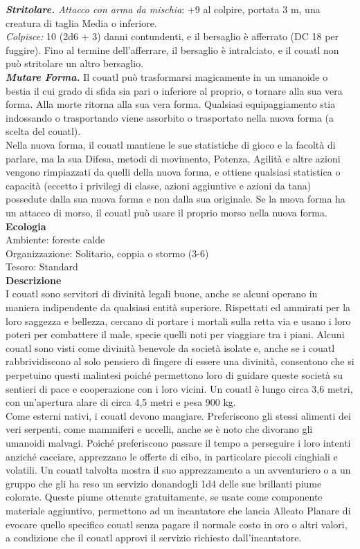 \begin{multicols}{2}
\emph{\textbf{Stritolare.} Attacco con arma da mischia}: +9 al colpire, portata 3 m, una creatura di taglia Media o inferiore.\\
\emph{Colpisce:} 10 (2d6 + 3) danni contundenti, e il bersaglio è afferrato (DC  18 per fuggire). Fino al termine dell'afferrare, il bersaglio è intralciato, e il couatl non può stritolare un altro bersaglio.\\
\emph{\textbf{Mutare Forma.}} Il couatl può trasformarsi magicamente in un umanoide o bestia il cui grado di sfida sia pari o inferiore al proprio, o tornare alla sua vera forma. Alla morte ritorna alla sua vera forma. Qualsiasi equipaggiamento stia indossando o trasportando viene assorbito o trasportato nella nuova forma (a scelta del couatl).\\
Nella nuova forma, il couatl mantiene le sue statistiche di gioco e la facoltà di parlare, ma la sua Difesa, metodi di movimento, Potenza, Agilità e altre azioni vengono rimpiazzati da quelli della nuova forma, e ottiene qualsiasi statistica o capacità (eccetto i privilegi di classe, azioni aggiuntive e azioni da tana) possedute dalla sua nuova forma e non dalla sua originale. Se la nuova forma ha un attacco di morso, il couatl può usare il proprio morso nella nuova forma.\\
\textbf{Ecologia}\\
Ambiente: foreste calde\\
Organizzazione: Solitario, coppia o stormo (3-6)\\
Tesoro: Standard\\
\textbf{Descrizione}\\
I couatl sono servitori di divinità legali buone, anche se alcuni operano in maniera indipendente da qualsiasi entità superiore. Rispettati ed ammirati per la loro saggezza e bellezza, cercano di portare i mortali sulla retta via e usano i loro poteri per combattere il male, specie quelli noti per viaggiare tra i piani. Alcuni couatl sono visti come divinità benevole da società isolate e, anche se i couatl rabbrividiscono al solo pensiero di fingere di essere una divinità, consentono che si perpetuino questi malintesi poiché permettono loro di guidare queste società su sentieri di pace e cooperazione con i loro vicini. Un couatl è lungo circa 3,6 metri, con un’apertura alare di circa 4,5 metri e pesa 900 kg.\\
Come esterni nativi, i couatl devono mangiare. Preferiscono gli stessi alimenti dei veri serpenti, come mammiferi e uccelli, anche se è noto che divorano gli umanoidi malvagi. Poiché preferiscono passare il tempo a perseguire i loro intenti anziché cacciare, apprezzano le offerte di cibo, in particolare piccoli cinghiali e volatili. Un couatl talvolta mostra il suo apprezzamento a un avventuriero o a un gruppo che gli ha reso un servizio donandogli 1d4 delle sue brillanti piume colorate. Queste piume ottenute gratuitamente, se usate come componente materiale aggiuntivo, permettono ad un incantatore che lancia Alleato Planare di evocare quello specifico couatl senza pagare il normale costo in oro o altri valori, a condizione che il couatl approvi il servizio richiesto dall’incantatore.\\


\end{multicols}

